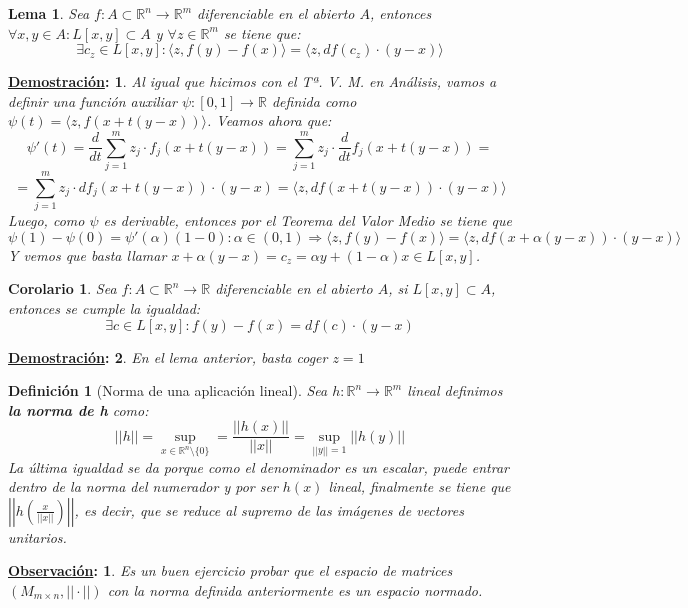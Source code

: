 \documentclass[10pt,a4paper,openright]{book}
\theoremstyle{break}
\newtheorem*{defi}{Definición}
\newtheorem*{coro}{Corolario}
\newtheorem*{lema}{Lema}
\newtheorem*{demo}{\underline{Demostración}:}
\newtheorem*{obs}{\underline{Observación}:}
\begin{document}
\begin{lema}
Sea $f: A \subset \mathbb{R}^n \to \mathbb{R}^m$ diferenciable en el abierto $A$, entonces $\forall x,y \in A : L[x,y] \subset A$ y $\forall z \in \mathbb{R}^m$ se tiene que:
$$\exists c_z \in L [x,y] : \langle z, f(y) - f(x)\rangle = \langle z, df(c_z) \cdot (y-x) \rangle$$
\end{lema}
\begin{demo}
Al igual que hicimos con el Tª. V. M. en Análisis, vamos a definir una función auxiliar $\psi:[0,1] \to \mathbb{R}$ definida como $\psi(t) = \langle z, f(x+t(y-x)) \rangle$. Veamos ahora que:
$$\psi ' (t) = \frac{d}{dt}  \sum_{j=1}^{m} z_j \cdot f_j (x + t(y-x)) = \sum_{j=1}^{m} z_j \cdot \frac{d}{dt} f_j (x + t(y-x)) =$$
$$= \sum_{j=1}^{m} z_j \cdot d f_j (x + t(y-x)) \cdot (y-x)= \langle z, df(x + t(y-x)) \cdot (y-x) \rangle$$
Luego, como $\psi$ es derivable, entonces por el Teorema del Valor Medio se tiene que
$$\psi (1) - \psi (0) = \psi'(\alpha) (1-0) : \alpha \in (0,1)\Rightarrow \langle z, f(y) - f(x)\rangle = \langle z, df(x + \alpha (y-x)) \cdot(y-x) \rangle$$
Y vemos que basta llamar $x + \alpha (y-x) = c_z = \alpha y + (1 - \alpha ) x \in L[x,y]$.
\end{demo}


\begin{coro}
Sea $f: A \subset \mathbb{R}^n \to \mathbb{R}$ diferenciable en el abierto $A$, si $L[x,y] \subset A$, entonces se cumple la igualdad:
$$\exists c \in L[x,y] : f(y) - f(x) = df(c) \cdot (y-x)$$
\end{coro}
\begin{demo}
En el lema anterior, basta coger $z = 1$
\end{demo}

\begin{defi}[Norma de una aplicación lineal]
Sea $h: \mathbb{R}^n \to \mathbb{R}^m$ lineal definimos \textbf{la norma de h} como:
$$||h|| = \sup_{x \in \mathbb{R}^n \setminus \{0\}} = \frac{||h(x)||}{||x||} = \sup_{||y|| = 1} || h(y)|| $$
La última igualdad se da porque como el denominador es un escalar, puede entrar dentro de la norma del numerador y por ser $h(x)$ lineal, finalmente se tiene que $\left|\left|h\left(\frac{x}{||x||}\right)\right|\right|$, es decir, que se reduce al supremo de las imágenes de vectores unitarios.
\end{defi}

\begin{obs}
Es un buen ejercicio probar que el espacio de matrices $(M_{m \times n}, || \cdot || ) $ con la norma definida anteriormente es un espacio normado.
\end{obs}
\end{document}
